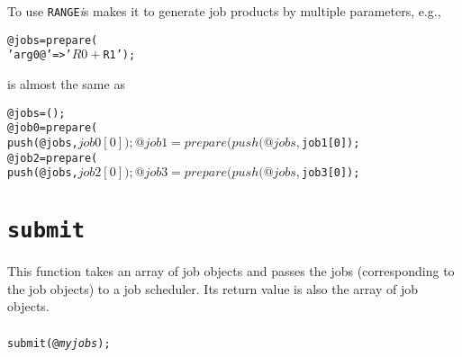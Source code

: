 \documentclass[a4paper,10pt]{report}
\begin{document}
To use \texttt{RANGE}\textit{i}s makes it to generate job products by
multiple parameters, e.g.,
\begin{boxnote}
\begin{alltt}
%template = ('id' => '\textit{myjob}', 'exe' => '\textit{./myexe}');
@jobs = prepare(%template, 'RANGE0' => [0,1], 'RANGE1' => [2,4],
                           'arg0@' => '$R0 + $R1');
\end{alltt}
\end{boxnote}
\vspace{\baselineskip}
\noindent
is almost the same as
\begin{boxnote}
\begin{alltt}
%template = ('id' => '\textit{myjob}', 'exe' => '\textit{./myexe}');
@jobs = ();
@job0 = prepare(%template, 'arg0' => '0', 'arg1' => '2');
push(@jobs, $job0[0]);
@job1 = prepare(%template, 'arg0' => '0', 'arg1' => '4');
push(@jobs, $job1[0]);
@job2 = prepare(%template, 'arg0' => '1', 'arg1' => '2');
push(@jobs, $job2[0]);
@job3 = prepare(%template, 'arg0' => '1', 'arg1' => '4');
push(@jobs, $job3[0]);
\end{alltt}
\end{boxnote}

\section{\texttt{submit}}\label{sec:submit}

This function takes an array of job objects and passes the jobs
(corresponding to the job objects) to a job scheduler.  Its return
value is also the array of job objects.

\subsubsection{\format}
\begin{boxnote}
\begin{alltt}
submit(@\textit{myjobs});
\end{alltt}
\end{boxnote}
\vspace{\baselineskip}
\end{document}
